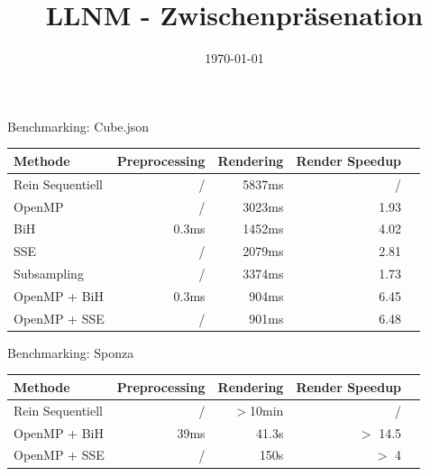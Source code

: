 


\title[LLNM]{LLNM - Zwischenpräsenation}
\subtitle{}
\date{\today}

	\begin{frame}
		\titlepage
	\end{frame}
	\begin{frame}{Benchmarking: Cube.json}
		\begin{tabular}{l*{4}{r}}
		Methode           & Preprocessing & Rendering & Render Speedup \\%
		\hline
		Rein Sequentiell  & /      & 5837ms & /      \\%
		OpenMP            & /      & 3023ms & 1.93   \\%
		BiH               & 0.3ms  & 1452ms & 4.02   \\%
		SSE               & /      & 2079ms & 2.81   \\%
		Subsampling       & /      & 3374ms & 1.73   \\%
		OpenMP + BiH      & 0.3ms  &  904ms & 6.45   \\%
		OpenMP + SSE      & /      &  901ms & 6.48   \\%
		\end{tabular}
	\end{frame}
	\begin{frame}{Benchmarking: Sponza}
		\begin{tabular}{l*{4}{r}}
		Methode           & Preprocessing & Rendering & Render Speedup \\%
		\hline
		Rein Sequentiell  & /      & $>$10min & /        \\
		OpenMP + BiH      & 39ms   & 41.3s    & $>$ 14.5 \\
		OpenMP + SSE      & /      & 150s     & $>$ 4    \\
		\end{tabular}
	\end{frame}
